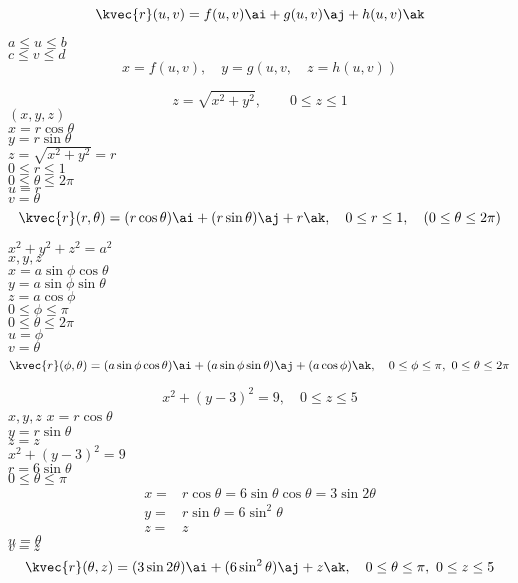 \begin{equation}
\kvec{r}(u,v)= f(u,v)\ai +g(u,v)\aj+h(u,v)\ak
\end{equation}

\(a\le u\le b\) \\
\(c\le v \le d\) \\
 \[x=f(u,v),\quad y=g(u,v, \quad z=h(u,v))\]

\[z=\sqrt{x^2+y^2},\quad \quad 0\le z\le 1\]
\((x,y,z)\)  \\
\(x=r\cos\theta\)  \\
\(y=r\sin\theta\)  \\
\(z=\sqrt{x^2+y^2}=r\)  \\
\(0\le r\le 1\)  \\
\(0\le \theta \le 2\pi\)  \\
\(u=r\)  \\
\(v=\theta\)   \\
\[\kvec{r}(r,\theta)=(r\cos\theta)\ai+(r\sin\theta)\aj+r\ak,\quad 0\le r\le 1,\quad (0\le \theta \le 2\pi)\]

\(x^2+y^2+z^2=a^2\)  \\
\(x,y,z\)   \\
\(x=a\sin\phi \cos\theta\)  \\
\(y=a\sin\phi \sin\theta\)   \\
\(z=a\cos\phi\)  \\
\(0\le \phi \le \pi\)  \\
\(0\le \theta \le 2\pi\)  \\
\(u=\phi\)  \\
\(v=\theta\)  \\
\[\kvec{r}(\phi, \theta)=(a\sin\phi \cos\theta)\ai+(a\sin\phi \sin\theta)\aj+(a\cos\phi)\ak,\quad 0\le \phi \le \pi, \,\,0\le \theta \le 2\pi\]



\[x^2+(y-3)^2=9,\quad 0\le z\le 5\]
\(x,y,z\)
\(x=r\cos\theta\)\\
\(y=r\sin\theta\)\\
\(z=z\)\\
\(x^2+(y-3)^2=9\)\\
\(r=6\sin\theta\)\\
\(0\le \theta \le \pi\)\\
\begin{align*}
x=&r\cos\theta=6\sin\theta\cos\theta =3\sin 2\theta\\
y=& r\sin \theta = 6\sin^2 \theta\\
z=&z
\end{align*}
\(u=\theta\)\\
\(v=z\)\\
\[\kvec{r}(\theta ,z)=(3\sin 2\theta)\ai+(6\sin^2 \theta)\aj+z\ak, \quad 0\le \theta \le \pi, \,\, 0\le z \le5\]

